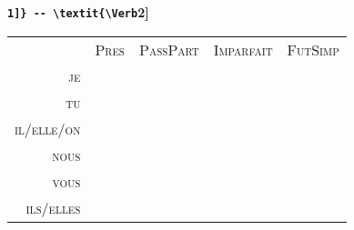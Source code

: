\begin{minipage}{\linewidth}

\newcommand{\HeaderTop}[1]{\textsc{#1}}
\newcommand{\HeaderSide}[1]{\textsc{#1}}

\textbf{\Verb[1]} -- \textit{\Verb[2]}
\vspace{-0.5em}
\begin{table}[H]
    \TableSize
		\begin{tabular}{r||c|c|c|c}
		     & \HeaderTop{Pres} & \HeaderTop{PassPart} & \HeaderTop{Imparfait} & \HeaderTop{FutSimp} \\
			\HeaderSide{je} & \Present[1] & \PasseCompose[1] & \Imparfait[1] & \FutureSimple[1] \\
			\HeaderSide{tu} & \Present[2] & \PasseCompose[1] & \Imparfait[2] & \FutureSimple[2] \\
			\HeaderSide{il/elle/on} &\Present[3]  & \PasseCompose[1] & \Imparfait[3] &\FutureSimple[3] \\
			\HeaderSide{nous} & \Present[4] & \PasseCompose[1] & \Imparfait[4] &\FutureSimple[4] \\
			\HeaderSide{vous} & \Present[5] &\PasseCompose[1] & \Imparfait[5] & \FutureSimple[5] \\
			\HeaderSide{ils/elles} &\Present[6]  &\PasseCompose[1] & \Imparfait[6] &\FutureSimple[6] 
		\end{tabular}
\end{table}

\vspace{0.2em}

\end{minipage}